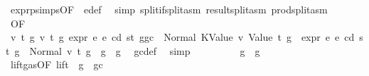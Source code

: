\begin{isabellebody}
\ expr{\isachardot}{\kern0pt}psimps{\isacharparenleft}{\kern0pt}{}{}{\isacharparenright}{\kern0pt}{\isacharbrackleft}{\kern0pt}OF\ {}{}{\isacharparenleft}{\kern0pt}{}{\isacharparenright}{\kern0pt}{\isacharbrackright}{\kern0pt}\ e{\isacharunderscore}{\kern0pt}def\ \isamarkupfalse%
\ {\isacharparenleft}{\kern0pt}simp\ split{\isacharcolon}{\kern0pt}if{\isacharunderscore}{\kern0pt}split{\isacharunderscore}{\kern0pt}asm\ result{\isachardot}{\kern0pt}split{\isacharunderscore}{\kern0pt}asm\ prod{\isachardot}{\kern0pt}split{\isacharunderscore}{\kern0pt}asm{\isacharparenright}{\kern0pt}\isanewline
\ \ \ \ \ \ \isamarkupfalse%
\ {}{}{\isacharparenleft}{\kern0pt}{}{\isacharparenright}{\kern0pt}{\isacharbrackleft}{\kern0pt}OF\ {\isacharasterisk}{\kern0pt}\ {\isacharasterisk}{\kern0pt}{\isacharasterisk}{\kern0pt}\ {\isacharasterisk}{\kern0pt}{\isacharasterisk}{\kern0pt}{\isacharasterisk}{\kern0pt}{\isacharbrackright}{\kern0pt}\ \isamarkupfalse%
\ {\isachardoublequoteopen}{\isasymAnd}v\ t\ g{\isacharprime}{\kern0pt}\ v{\isacharprime}{\kern0pt}\ t{\isacharprime}{\kern0pt}\ g{\isacharprime}{\kern0pt}{\isacharprime}{\kern0pt}{\isachardot}{\kern0pt}\ expr\ e{}\ e\ cd\ st\ {\isacharparenleft}{\kern0pt}g{\isacharminus}{\kern0pt}gc{\isacharparenright}{\kern0pt}\ {\isacharequal}{\kern0pt}\ Normal\ {\isacharparenleft}{\kern0pt}{\isacharparenleft}{\kern0pt}KValue\ v{\isacharcomma}{\kern0pt}\ Value\ t{\isacharparenright}{\kern0pt}{\isacharcomma}{\kern0pt}\ g{\isacharprime}{\kern0pt}{\isacharparenright}{\kern0pt}\ {\isasymLongrightarrow}\ expr\ e{}\ e\ cd\ st\ g{\isacharprime}{\kern0pt}\ {\isacharequal}{\kern0pt}\ Normal\ {\isacharparenleft}{\kern0pt}{\isacharparenleft}{\kern0pt}v{\isacharprime}{\kern0pt}{\isacharcomma}{\kern0pt}\ t{\isacharprime}{\kern0pt}{\isacharparenright}{\kern0pt}{\isacharcomma}{\kern0pt}\ g{\isacharprime}{\kern0pt}{\isacharprime}{\kern0pt}{\isacharparenright}{\kern0pt}\ {\isasymLongrightarrow}\ g{\isacharprime}{\kern0pt}{\isacharprime}{\kern0pt}\ {\isasymle}\ g{\isacharprime}{\kern0pt}{\isachardoublequoteclose}\ \isamarkupfalse%
\ gc{\isacharunderscore}{\kern0pt}def\ \isamarkupfalse%
\ simp\isanewline
\ \ \ \ \ \ \isamarkupfalse%
\ \isamarkupfalse%
\ {\isachardoublequoteopen}g{}\ {\isasymle}\ g{\isachardoublequoteclose}\ \isamarkupfalse%
\ lift{\isacharunderscore}{\kern0pt}gas{\isacharbrackleft}{\kern0pt}OF\ lift{\isacharbrackright}{\kern0pt}\ {\isacharbackquoteopen}{\isasymnot}\ g\ {\isasymle}\ gc{\isacharbackquoteclose}\ \isamarkupfalse%

\end{isabellebody}

